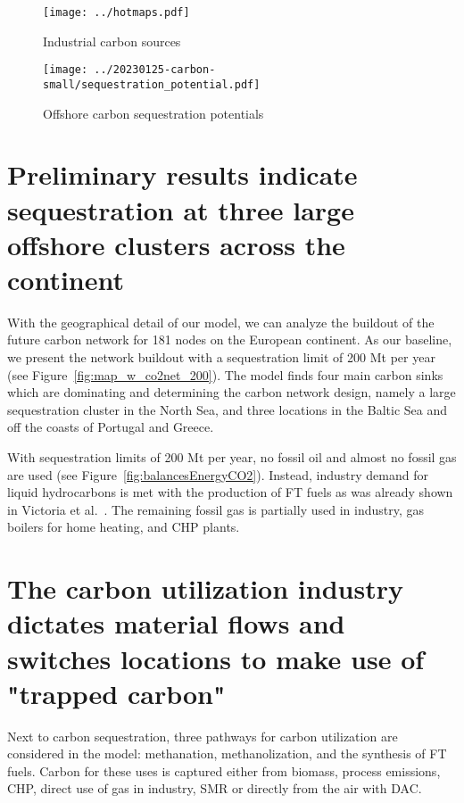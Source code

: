 \documentclass[10pt,5p,reversenotenum,lefttitle]{elsarticle}
\begin{document}
\begin{figure}[!ht]
  \centering
  \texttt{[image: ../hotmaps.pdf]}\hfill
  \caption{Industrial carbon sources}
  \label{fig:carbonSources}
\end{figure}

\begin{figure}[!ht]
  \centering
  \texttt{[image: ../20230125-carbon-small/sequestration\_potential.pdf]}\hfill
  \caption{Offshore carbon sequestration potentials}
  \label{fig:carbonSequestrationPotentials}
\end{figure}

\section*{Preliminary results indicate sequestration at three large offshore clusters across the continent}
\label{sec:results}


With the geographical detail of our model, we can analyze the buildout of the future carbon network for 181 nodes on the European continent. As our baseline, we present the network buildout with a sequestration limit of 200 Mt per year (see Figure~\ref{fig:map_w_co2net_200}). The model finds four main carbon sinks which are dominating and determining the carbon network design, namely a large sequestration cluster in the North Sea, and three locations in the Baltic Sea and off the coasts of Portugal and Greece.

With sequestration limits of 200 Mt per year, no fossil oil and almost no fossil gas are used (see Figure~\ref{fig:balancesEnergyCO2}). Instead, industry demand for liquid hydrocarbons is met with the production of FT fuels as was already shown in Victoria et al.~\cite{victoriaSpeedTechnologicalTransformations2022}. The remaining fossil gas is partially used in industry, gas boilers for home heating, and CHP plants.

\section*{The carbon utilization industry dictates material flows and switches locations to make use of "trapped carbon"}
\label{sec:carbonUtilization}
Next to carbon sequestration, three pathways for carbon utilization are considered in the model: methanation, methanolization, and the synthesis of FT fuels. Carbon for these uses is captured either from biomass, process emissions, CHP, direct use of gas in industry, SMR or directly from the air with DAC.
\end{document}
